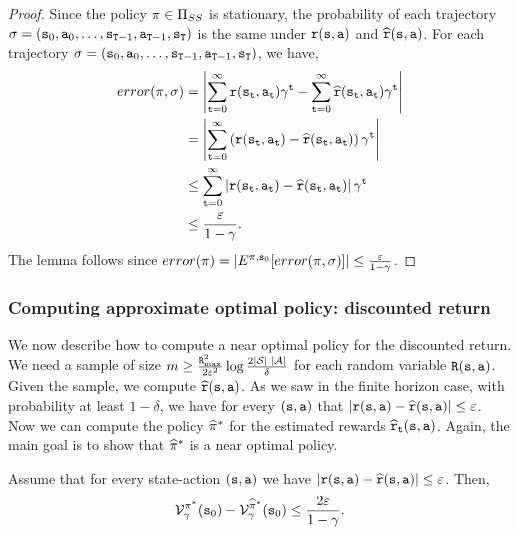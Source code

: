 \begin{proof}
Since the policy $\pi\in {\Pi _{SS}}$ is stationary, the
probability of each trajectory $\sigma=({\tt s}_0,{\tt a}_0,\ldots,
{\tt s}_{{\tt T}-1},{\tt a}_{{\tt T}-1},{\tt s}_{\tt T})$ is the
same under ${\tt r}({\tt s},{\tt a})$ and
$\widehat{{\tt r}}({\tt s},{\tt a})$. For each trajectory
$\sigma=({\tt s}_0,{\tt a}_0,\ldots,
{\tt s}_{{\tt T}-1},{\tt a}_{{\tt T}-1},{\tt s}_{\tt T})$, we
have,
\begin{align*}
error(\pi,\sigma)&=\left|\sum_{{\tt t}=0}^\infty
{\tt r}({\tt s}_{\tt t},{\tt a}_{\tt t})\gamma^{\tt t}
-\sum_{{\tt t}=0}^\infty
\widehat{{\tt r}}({\tt s}_{\tt t},{\tt a}_{\tt t})\gamma^{\tt t} \right| \\
&= \left|\sum_{{\tt t}=0}^\infty \left({\tt r}({\tt s}_{\tt t},{\tt a}_{\tt t})-\widehat{{\tt r}}({\tt s}_{\tt t},{\tt a}_{\tt t})\right)\gamma^{\tt t} \right|\\
&\leq \sum_{{\tt t}=0}^\infty \left|{\tt r}({\tt s}_{\tt t},{\tt a}_{\tt t})-\widehat{{\tt r}}({\tt s}_{\tt t},{\tt a}_{\tt t})\right|\gamma^{\tt t} \\
&\leq \frac{\varepsilon}{1-\gamma} .
\end{align*}
The lemma follows since
$error(\pi)=|E^{\pi,{\tt s}_0}[error(\pi,\sigma)]|\leq
\frac{\varepsilon}{1-\gamma}$.
\end{proof}

\subsubsection{Computing approximate optimal policy: discounted return}

We now describe how to compute a near optimal policy for the
discounted return.
We need a sample of size $m\geq \frac{{\tt R}_{\max }^2}{2\varepsilon^2}\log
\frac{2|\mathcal{S}|\;|\mathcal{A}|}{\delta}$ for each random variable
${\tt R}({\tt s},{\tt a})$. Given the sample, we compute
$\widehat{{\tt r}}({\tt s},{\tt a})$. As we saw in the finite horizon
case, with probability at least $1-\delta$, we have for every
$({\tt s},{\tt a})$ that
$|{\tt r}({\tt s},{\tt a})-\widehat{{\tt r}}({\tt s},{\tt a})|\leq
\varepsilon$. Now we can compute the policy $\widehat{\pi}^*$
for the estimated rewards
$\widehat{{\tt r}}_{\tt t}({\tt s},{\tt a})$. Again, the main goal is
to show that $\widehat{\pi}^*$ is a near optimal policy.

\begin{theorem}
\label{thm:approx-model-disc}
%
Assume that for every state-action $({\tt s},{\tt a})$ we have
$|{\tt r}({\tt s},{\tt a})-\widehat{{\tt r}}({\tt s},{\tt a})|\leq
\varepsilon$. Then,
\[
\mathcal{V}^{\pi^*}_\gamma({\tt s}_0) -
\mathcal{V}^{\widehat{\pi}^*}_\gamma({\tt s}_0) \leq
\frac{2\varepsilon}{1-\gamma}.
\]
\end{theorem}

